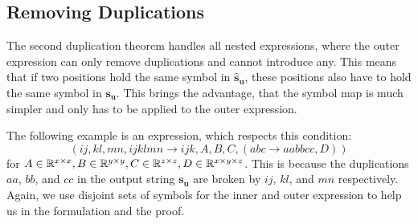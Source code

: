 \subsection{Removing Duplications}

The second duplication theorem handles all nested expressions, where the outer expression can only remove duplications and cannot introduce any.
This means that if two positions hold the same symbol in $\bm{\hat{s}_u}$, these positions also have to hold the same symbol in $\bm{s_u}$.
This brings the advantage, that the symbol map is much simpler and only has to be applied to the outer expression.

The following example is an expression, which respects this condition:
$$(ij, kl, mn, ijklmn \rightarrow ijk, A, B, C, (abc \rightarrow aabbcc, D))$$
for $A \in \mathbb{R}^{x \times x}, B \in \mathbb{R}^{y \times y}, C \in \mathbb{R}^{z \times z}, D \in \mathbb{R}^{x \times y \times z}$.
This is because the duplications $aa$, $bb$, and $cc$ in the output string $\bm{s_u}$ are broken by $ij$, $kl$, and $mn$ respectively.
Again, we use disjoint sets of symbols for the inner and outer expression to help us in the formulation and the proof.

